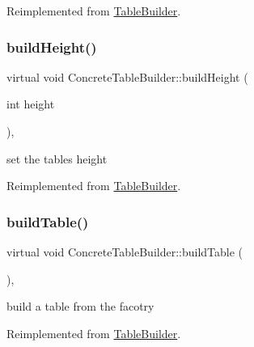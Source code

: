 Reimplemented from \mbox{\hyperlink{class_table_builder_a02a8d4ae71a3ef43ffd283ac10aa2e19}{Table\+Builder}}.

\mbox{\label{class_concrete_table_builder_a3e72d6d46e47146e385fff3937718a13}} 
\subsubsection{\texorpdfstring{build\+Height()}{buildHeight()}}
{\footnotesize\ttfamily virtual void Concrete\+Table\+Builder\+::build\+Height (\begin{DoxyParamCaption}\item[{int}]{height }\end{DoxyParamCaption})\hspace{0.3cm}{\ttfamily [inline]}, {\ttfamily [virtual]}}

set the table\textquotesingle{}s height 

Reimplemented from \mbox{\hyperlink{class_table_builder_ad3e3bb11cd8f9eecd49ad6012e358d05}{Table\+Builder}}.

\mbox{\label{class_concrete_table_builder_af49b5e371e6f725303e4b2f011d20fad}} 
\subsubsection{\texorpdfstring{build\+Table()}{buildTable()}}
{\footnotesize\ttfamily virtual void Concrete\+Table\+Builder\+::build\+Table (\begin{DoxyParamCaption}{ }\end{DoxyParamCaption})\hspace{0.3cm}{\ttfamily [inline]}, {\ttfamily [virtual]}}

build a table from the facotry 

Reimplemented from \mbox{\hyperlink{class_table_builder_a4aba0952fb1912f9ff7ca4cfb3085dd9}{Table\+Builder}}.

\mbox{\label{class_concrete_table_builder_a154545f9b286b6a9ccff09a28c7a644d}} 
